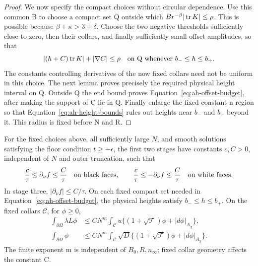 \begin{proof}
We now specify the compact choices without circular dependence.
Use this common B to choose a compact set Q outside which
\(Br^{-\beta}|\operatorname{tr} K|\le\rho\).
This is possible because \(\beta+\kappa>3+\delta\).
Choose the two negative thresholds sufficiently close to zero,
then their collars, and finally sufficiently small offset amplitudes,
so that
\[
 |(h+C)\operatorname{tr} K|+|\nabla C|\le\rho
 \quad\hbox{on Q whenever } b_-\le h\le b_+ .
\]
The constants controlling derivatives of the now fixed collars
need not be uniform in this choice.  The next lemma proves precisely
the required physical height interval on Q.  Outside Q the end
bound proves Equation~\eqref{eq:ah-offset-budget}, after making
the support of C lie in Q.  Finally enlarge the fixed constant-n
region so that Equation~\eqref{eq:ah-height-bounds} rules out
heights near \(b_-\) and \(b_+\) beyond it.  This radius is fixed
before N and R.
\end{proof}

\begin{lemma}
\label{lem:ah-collars}
For the fixed choices above, all sufficiently large \(N\), and smooth
solutions satisfying the floor condition \(t\ge-\epsilon\), the
first two stages have constants \(c,C>0\), independent of \(N\)
and outer truncation, such that
\[
 \frac c\tau\le\partial_\nu f\le\frac C\tau
 \quad\hbox{on black faces},\qquad
 \frac c\tau\le-\partial_\nu f\le\frac C\tau
 \quad\hbox{on white faces}.
\]
In stage three, \(|\partial_\nu f|\le C/\tau\).
On each fixed compact set needed in
Equation~\eqref{eq:ah-offset-budget}, the physical heights satisfy
\(b_-\le h\le b_+\).
On the fixed collars \(\mathcal C\), for \(\phi\ge0\),
\begin{equation}\label{eq:ah-polynomial-trace}
 \begin{split}
 \int_{\partial\Omega}\lambda L\phi
 &\le CN^m\int_{\mathcal C}
 u\{(1+\sqrt{\mathcal T})\phi+|d\phi|_{A_\chi}\},\\
 \int_{\partial\Omega}\phi
 &\le CN^m\int_{\mathcal C}
 \sqrt D\{(1+\sqrt{\mathcal T})\phi+|d\phi|_{A_\chi}\}.
 \end{split}
\end{equation}
The finite exponent m is independent of \(B_0,R,n_\infty\);
fixed collar geometry affects the constant C.
\end{lemma}

